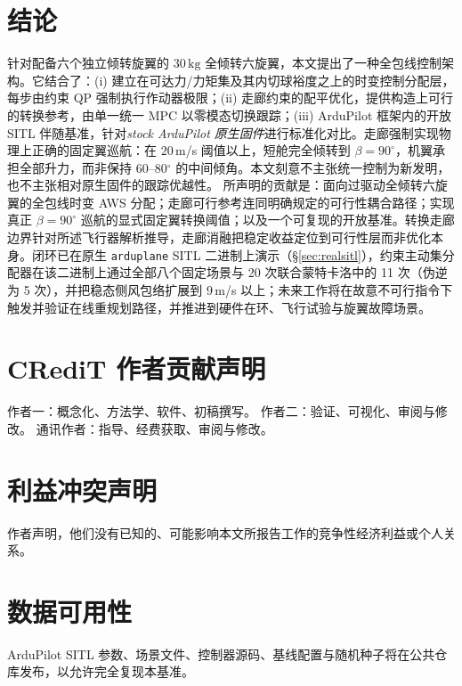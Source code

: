 \documentclass[UTF8,a4paper,11pt]{ctexart}
\newcommand{\SI}[2]{\ensuremath{#1\,#2}}
\newcommand{\kilogram}{\mathrm{kg}}
\begin{document}
\section{结论}\label{sec:conclusion}
针对配备六个独立倾转旋翼的 \SI{30}{\kilogram} 全倾转六旋翼，本文提出了一种全包线控制架构。它结合了：(i) 建立在可达力/力矩集及其内切球裕度之上的时变控制分配层，每步由约束 QP 强制执行作动器极限；(ii) 走廊约束的配平优化，提供构造上可行的转换参考，由单一统一 MPC 以零模态切换跟踪；(iii) ArduPilot 框架内的开放 SITL 伴随基准，针对\emph{stock ArduPilot 原生固件}进行标准化对比。走廊强制实现物理上正确的固定翼巡航：在 $20$\,m/s 阈值以上，短舱完全倾转到 $\beta=90^\circ$，机翼承担全部升力，而非保持 60--80$^\circ$ 的中间倾角。本文刻意不主张统一控制为新发明，也不主张相对原生固件的跟踪优越性。
所声明的贡献是：面向过驱动全倾转六旋翼的全包线时变 AWS 分配；走廊可行参考连同明确规定的可行性耦合路径；实现真正 $\beta=90^\circ$ 巡航的显式固定翼转换阈值；以及一个可复现的开放基准。转换走廊边界针对所述飞行器解析推导，走廊消融把稳定收益定位到可行性层而非优化本身。闭环已在原生 \texttt{arduplane} SITL 二进制上演示（\S\ref{sec:realsitl}），约束主动集分配器在该二进制上通过全部八个固定场景与 20 次联合蒙特卡洛中的 11 次（伪逆为 5 次），并把稳态侧风包络扩展到 9\,m/s 以上；未来工作将在故意不可行指令下触发并验证在线重规划路径，并推进到硬件在环、飞行试验与旋翼故障场景。

\section*{CRediT 作者贡献声明}
作者一：概念化、方法学、软件、初稿撰写。
作者二：验证、可视化、审阅与修改。
通讯作者：指导、经费获取、审阅与修改。

\section*{利益冲突声明}
作者声明，他们没有已知的、可能影响本文所报告工作的竞争性经济利益或个人关系。

\section*{数据可用性}
ArduPilot SITL 参数、场景文件、控制器源码、基线配置与随机种子将在公共仓库发布，以允许完全复现本基准。

\appendix
\end{document}
